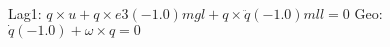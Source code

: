 
Lag1: $q\times u+q\times e3 (-1.0) m g l+q\times \ddot{q} (-1.0) m l l = 0$
Geo: $\dot{q} (-1.0)+\omega \times q = 0$